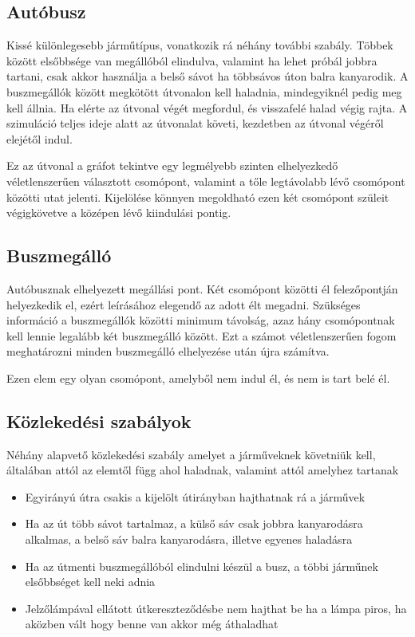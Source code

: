 \subsection{Autóbusz}
Kissé különlegesebb járműtípus, vonatkozik rá néhány további szabály. Többek között elsőbbsége van megállóból elindulva, valamint ha lehet próbál jobbra tartani, csak akkor használja a belső sávot ha többsávos úton balra kanyarodik. A buszmegállók között megkötött útvonalon kell haladnia, mindegyiknél pedig meg kell állnia. Ha elérte az útvonal végét megfordul, és visszafelé halad végig rajta. A szimuláció teljes ideje alatt az útvonalat követi, kezdetben az útvonal végéről elejétől indul.

Ez az útvonal a gráfot tekintve egy legmélyebb szinten elhelyezkedő véletlenszerűen választott csomópont, valamint a tőle legtávolabb lévő csomópont közötti utat jelenti. Kijelölése könnyen megoldható ezen két csomópont szüleit végigkövetve a középen lévő kiindulási pontig.
\subsection{Buszmegálló}
Autóbusznak elhelyezett megállási pont. Két csomópont közötti él felezőpontján helyezkedik el, ezért leírásához elegendő az adott élt megadni. Szükséges információ a buszmegállók közötti minimum távolság, azaz hány csomópontnak kell lennie legalább két buszmegálló között. Ezt a számot véletlenszerűen fogom meghatározni minden buszmegálló elhelyezése után újra számítva.

Ezen elem egy olyan csomópont, amelyből nem indul él, és nem is tart belé él.
\subsection{Közlekedési szabályok}
Néhány alapvető közlekedési szabály amelyet a járműveknek követniük kell, általában attól az elemtől függ ahol haladnak, valamint attól amelyhez tartanak
\begin{itemize}
\item Egyirányú útra csakis a kijelölt útirányban hajthatnak rá a járművek
\item Ha az út több sávot tartalmaz, a külső sáv csak jobbra kanyarodásra alkalmas, a belső sáv balra kanyarodásra, illetve egyenes haladásra
\item Ha az útmenti buszmegállóból elindulni készül a busz, a többi járműnek elsőbbséget kell neki adnia
\item Jelzőlámpával ellátott útkereszteződésbe nem hajthat be ha a lámpa piros, ha aközben vált hogy benne van akkor még áthaladhat
\end{itemize}
